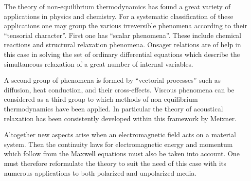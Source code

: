 The theory of non-equilibrium thermodynamics has found a great variety of applications in physics and chemistry. For a systematic classification of these applications one may group the various irreversible phenomena according to their ``tensorial character''. First one has ``scalar phenomena''. These include chemical reactions and structural relaxation phenomena. Onsager relations are of help in this case in solving the set of ordinary differential equations which describe the simultaneous relaxation of a great number of internal variables.

A second group of phenomena is formed by ``vectorial processes'' such as diffusion, heat conduction, and their cross-effects. Viscous phenomena can be considered as a third group to which methods of non-equilibrium thermodynamics have been applied. In particular the theory of acoustical relaxation has been consistently developed within this framework by Meixner.

Altogether new aspects arise when an electromagnetic field acts on a material system. Then the continuity laws for electromagnetic energy and momentum which follow from the Maxwell equations must also be taken into account. One must therefore reformulate the theory to suit the need of this case with its numerous applications to both polarized and unpolarized media.

